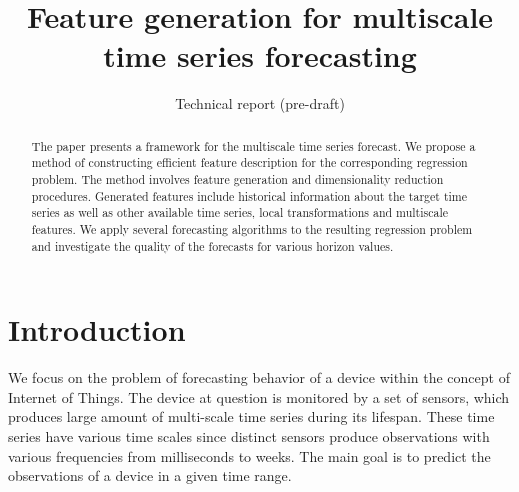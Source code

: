\documentclass[conference]{IEEEtran}
\begin{document}
\title{Feature generation for multiscale time series forecasting}



\date{Technical report (pre-draft)}
\maketitle

\begin{abstract}
The paper presents a framework for the multiscale time series forecast. We propose a method of constructing efficient feature description for the corresponding regression problem. The method involves feature generation and dimensionality reduction procedures. Generated features include historical information about the target time series as well as other available time series, local transformations and  multiscale features. We apply several forecasting algorithms to the resulting regression problem and investigate the quality of the forecasts for various horizon values.
\end{abstract}



\section{Introduction}
We focus on the problem of forecasting behavior of a device within the concept of Internet of Things. The device at question is monitored by a set of sensors, which produces large amount of multi-scale time series during its lifespan. These time series have various time scales since distinct sensors produce observations with various frequencies from milliseconds to weeks.  The main goal is to predict the observations of a device in a given time range.
\end{document}
